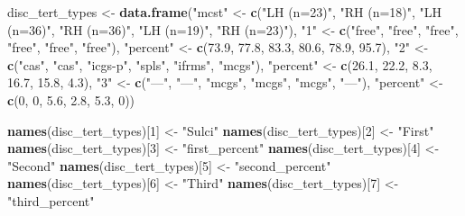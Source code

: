 \documentclass[
]{article}
\newenvironment{Shaded}{\begin{snugshade}}{\end{snugshade}}
\newcommand{\DecValTok}[1]{\textcolor[rgb]{0.00,0.00,0.81}{#1}}
\newcommand{\FloatTok}[1]{\textcolor[rgb]{0.00,0.00,0.81}{#1}}
\newcommand{\KeywordTok}[1]{\textcolor[rgb]{0.13,0.29,0.53}{\textbf{#1}}}
\newcommand{\NormalTok}[1]{#1}
\newcommand{\StringTok}[1]{\textcolor[rgb]{0.31,0.60,0.02}{#1}}
\begin{document}
\begin{Shaded}
\begin{Highlighting}[]
\NormalTok{disc_tert_types <-}\StringTok{ }\KeywordTok{data.frame}\NormalTok{(}\StringTok{"mcst"}\NormalTok{ <-}\StringTok{ }\KeywordTok{c}\NormalTok{(}\StringTok{"LH (n=23)"}\NormalTok{, }\StringTok{"RH (n=18)"}\NormalTok{, }\StringTok{"LH (n=36)"}\NormalTok{, }\StringTok{"RH (n=36)"}\NormalTok{, }\StringTok{"LH (n=19)"}\NormalTok{, }\StringTok{"RH (n=23)"}\NormalTok{),}
                \StringTok{"1"}\NormalTok{ <-}\StringTok{ }\KeywordTok{c}\NormalTok{(}\StringTok{"free"}\NormalTok{, }\StringTok{"free"}\NormalTok{, }\StringTok{"free"}\NormalTok{, }\StringTok{"free"}\NormalTok{, }\StringTok{"free"}\NormalTok{, }\StringTok{"free"}\NormalTok{),}
                \StringTok{"percent"}\NormalTok{ <-}\StringTok{ }\KeywordTok{c}\NormalTok{(}\FloatTok{73.9}\NormalTok{, }\FloatTok{77.8}\NormalTok{, }\FloatTok{83.3}\NormalTok{, }\FloatTok{80.6}\NormalTok{, }\FloatTok{78.9}\NormalTok{, }\FloatTok{95.7}\NormalTok{),}
                \StringTok{"2"}\NormalTok{ <-}\StringTok{ }\KeywordTok{c}\NormalTok{(}\StringTok{"cas"}\NormalTok{, }\StringTok{"cas"}\NormalTok{, }\StringTok{"icgs-p"}\NormalTok{, }\StringTok{"spls"}\NormalTok{, }\StringTok{"ifrms"}\NormalTok{, }\StringTok{"mcgs"}\NormalTok{),}
                \StringTok{"percent"}\NormalTok{ <-}\StringTok{ }\KeywordTok{c}\NormalTok{(}\FloatTok{26.1}\NormalTok{, }\FloatTok{22.2}\NormalTok{, }\FloatTok{8.3}\NormalTok{, }\FloatTok{16.7}\NormalTok{, }\FloatTok{15.8}\NormalTok{, }\FloatTok{4.3}\NormalTok{),}
                \StringTok{"3"}\NormalTok{ <-}\StringTok{ }\KeywordTok{c}\NormalTok{(}\StringTok{"---"}\NormalTok{, }\StringTok{"---"}\NormalTok{, }\StringTok{"mcgs"}\NormalTok{, }\StringTok{"mcgs"}\NormalTok{, }\StringTok{"mcgs"}\NormalTok{, }\StringTok{"---"}\NormalTok{),}
                \StringTok{"percent"}\NormalTok{ <-}\StringTok{ }\KeywordTok{c}\NormalTok{(}\DecValTok{0}\NormalTok{, }\DecValTok{0}\NormalTok{, }\FloatTok{5.6}\NormalTok{, }\FloatTok{2.8}\NormalTok{, }\FloatTok{5.3}\NormalTok{, }\DecValTok{0}\NormalTok{))}

\KeywordTok{names}\NormalTok{(disc_tert_types)[}\DecValTok{1}\NormalTok{] <-}\StringTok{ "Sulci"}
\KeywordTok{names}\NormalTok{(disc_tert_types)[}\DecValTok{2}\NormalTok{] <-}\StringTok{ "First"}
\KeywordTok{names}\NormalTok{(disc_tert_types)[}\DecValTok{3}\NormalTok{] <-}\StringTok{ "first_percent"}
\KeywordTok{names}\NormalTok{(disc_tert_types)[}\DecValTok{4}\NormalTok{] <-}\StringTok{ "Second"}
\KeywordTok{names}\NormalTok{(disc_tert_types)[}\DecValTok{5}\NormalTok{] <-}\StringTok{ "second_percent"}
\KeywordTok{names}\NormalTok{(disc_tert_types)[}\DecValTok{6}\NormalTok{] <-}\StringTok{ "Third"}
\KeywordTok{names}\NormalTok{(disc_tert_types)[}\DecValTok{7}\NormalTok{] <-}\StringTok{ "third_percent"}


\end{Highlighting}
\end{Shaded}
\end{document}
